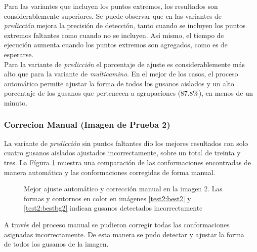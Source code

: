 Para las variantes que incluyen los puntos extremos, los resultados son
considerablemente superiores. Se puede observar que en las variantes de 
\emph{predicci\'on} mejora la precisi\'on de detecci\'on, tanto cuando
se incluyen los puntos extremos faltantes como cuando no se incluyen. As\'i
mismo, el tiempo de ejecuci\'on aumenta cuando los puntos extremos son
agregados, como es de esperarse.\\
Para la variante de \emph{predicci\'on} el porcentaje de ajuste es
considerablemente m\'as alto que para la variante de \emph{multicamino}.
En el mejor de los casos, el proceso autom\'atico permite ajustar
la forma de todos los gusanos aislados y un alto porcentaje de los
gusanos que pertenecen a agrupaciones ($87.8\%$), en menos de un minuto.

\subsubsection*{Correcion Manual (Imagen de Prueba 2)}

La variante de \emph{predicci\'on} sin puntos faltantes dio los mejores
resultados con solo cuatro gusanos aislados ajustados incorrectamente, sobre
un total de treinta y tres. La F\'igura \ref{fig:best2} muestra una comparaci\'on de 
las conformaciones encontradas de manera autom\'atica y 
las conformaciones corregidas de forma manual.

\begin{figure}[h]
  \centering
\qquad
\qquad
\qquad

\caption[Mejor ajuste autom\'atico y correcci\'on manual en la imagen 2]{Mejor ajuste autom\'atico y correcci\'on manual en la imagen 2.
Las formas y contornos en color en im\'agenes \ref{test2:best2} y \ref{test2:bestbg2} indican gusanos detectados incorrectamente} 
\label{fig:best2}
\end{figure}

A trav\'es del proceso manual se pudieron corregir todas las conformaciones asignadas incorrectamente.
De esta manera se pudo detectar y ajustar la forma de todos los gusanos de la imagen.

